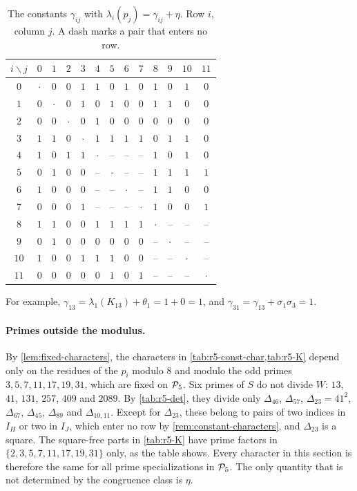 \begin{table}[htbp]
\centering
\caption{The constants $\gamma_{ij}$ with $\lambda_i(p_j)=\gamma_{ij}+\eta$. Row $i$, column $j$. A dash marks a pair that enters no row.}\label{tab:r5-cross}
\begin{tabular}{c*{12}{c}}
\toprule
$i\backslash j$ & $0$ & $1$ & $2$ & $3$ & $4$ & $5$ & $6$ & $7$ & $8$ & $9$ & $10$ & $11$\\
\midrule
$0$ & $\cdot$ & $0$ & $0$ & $1$ & $1$ & $0$ & $1$ & $0$ & $1$ & $0$ & $1$ & $0$ \\
$1$ & $0$ & $\cdot$ & $0$ & $1$ & $0$ & $1$ & $0$ & $0$ & $1$ & $1$ & $0$ & $0$ \\
$2$ & $0$ & $0$ & $\cdot$ & $0$ & $1$ & $0$ & $0$ & $0$ & $0$ & $0$ & $0$ & $0$ \\
$3$ & $1$ & $1$ & $0$ & $\cdot$ & $1$ & $1$ & $1$ & $1$ & $0$ & $1$ & $1$ & $0$ \\
\midrule
$4$ & $1$ & $0$ & $1$ & $1$ & $\cdot$ & -- & -- & -- & $1$ & $0$ & $1$ & $0$ \\
$5$ & $0$ & $1$ & $0$ & $0$ & -- & $\cdot$ & -- & -- & $1$ & $1$ & $1$ & $1$ \\
$6$ & $1$ & $0$ & $0$ & $0$ & -- & -- & $\cdot$ & -- & $1$ & $1$ & $0$ & $0$ \\
$7$ & $0$ & $0$ & $0$ & $1$ & -- & -- & -- & $\cdot$ & $1$ & $0$ & $0$ & $1$ \\
\midrule
$8$ & $1$ & $1$ & $0$ & $0$ & $1$ & $1$ & $1$ & $1$ & $\cdot$ & -- & -- & -- \\
$9$ & $0$ & $1$ & $0$ & $0$ & $0$ & $0$ & $0$ & $0$ & -- & $\cdot$ & -- & -- \\
$10$ & $1$ & $0$ & $0$ & $1$ & $1$ & $1$ & $0$ & $0$ & -- & -- & $\cdot$ & -- \\
$11$ & $0$ & $0$ & $0$ & $0$ & $0$ & $1$ & $0$ & $1$ & -- & -- & -- & $\cdot$ \\
\bottomrule
\end{tabular}
\end{table}

For example, $\gamma_{13}=\lambda_1(K_{13})+\theta_1=1+0=1$, and $\gamma_{31}=\gamma_{13}+\sigma_1\sigma_3=1$.

\paragraph{Primes outside the modulus.} By \cref{lem:fixed-characters}, the characters in \cref{tab:r5-const-char,tab:r5-K} depend only on the residues of the $p_i$ modulo $8$ and modulo the odd primes $3,5,7,11,17,19,31$, which are fixed on $\mathcal P_5$. Six primes of $S$ do not divide $W$: $13$, $41$, $131$, $257$, $409$ and $2089$. By \cref{tab:r5-det}, they divide only $\Delta_{46}$, $\Delta_{57}$, $\Delta_{23}=41^2$, $\Delta_{67}$, $\Delta_{45}$, $\Delta_{89}$ and $\Delta_{10,11}$. Except for $\Delta_{23}$, these belong to pairs of two indices in $I_H$ or two in $I_J$, which enter no row by \cref{rem:constant-characters}, and $\Delta_{23}$ is a square. The square-free parts in \cref{tab:r5-K} have prime factors in $\{2,3,5,7,11,17,19,31\}$ only, as the table shows. Every character in this section is therefore the same for all prime specializations in $\mathcal P_5$. The only quantity that is not determined by the congruence class is $\eta$.

